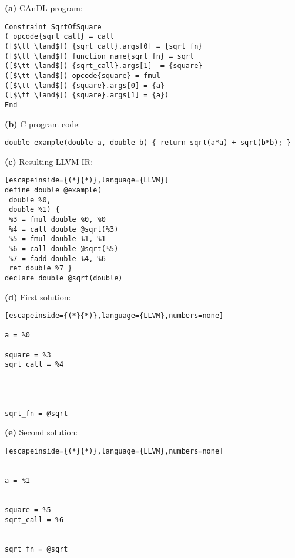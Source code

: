 \centering
\begin{minipage}[t]{0.67\textwidth}
\centering
{\bf(a)} CAnDL program:
\begin{lstlisting}[language=CAnDL]
Constraint SqrtOfSquare
( opcode{sqrt_call} = call
([$\tt \land$]) {sqrt_call}.args[0] = {sqrt_fn}
([$\tt \land$]) function_name{sqrt_fn} = sqrt
([$\tt \land$]) {sqrt_call}.args[1]  = {square}
([$\tt \land$]) opcode{square} = fmul
([$\tt \land$]) {square}.args[0] = {a}
([$\tt \land$]) {square}.args[1] = {a})
End
\end{lstlisting}
\end{minipage}

\begin{minipage}[t]{\textwidth}
\centering
\begin{minipage}[t]{\textwidth}
\centering
{\bf(b)} C program code:
\begin{lstlisting}
double example(double a, double b) { return sqrt(a*a) + sqrt(b*b); }
\end{lstlisting}
\end{minipage}
\begin{minipage}[t]{4.785cm}
\centering
{\bf(c)} Resulting LLVM IR:
\begin{lstlisting}[escapeinside={(*}{*)},language={LLVM}]
define double @example(    
 double %0,                
 double %1) {              
 %3 = fmul double %0, %0   
 %4 = call double @sqrt(%3)
 %5 = fmul double %1, %1   
 %6 = call double @sqrt(%5)
 %7 = fadd double %4, %6   
 ret double %7 }
declare double @sqrt(double)      
\end{lstlisting}
\end{minipage}
\hfill
\begin{minipage}[t]{4.03cm}
\centering
{\bf(d)} First solution:
\begin{lstlisting}[escapeinside={(*}{*)},language={LLVM},numbers=none]

a = %0

square = %3
sqrt_call = %4 




sqrt_fn = @sqrt
\end{lstlisting}
\end{minipage}
\hfill
\begin{minipage}[t]{4.03cm}
\centering
{\bf(e)} Second solution:
\begin{lstlisting}[escapeinside={(*}{*)},language={LLVM},numbers=none]


a = %1


square = %5
sqrt_call = %6


sqrt_fn = @sqrt
\end{lstlisting}
\end{minipage}
\end{minipage}


